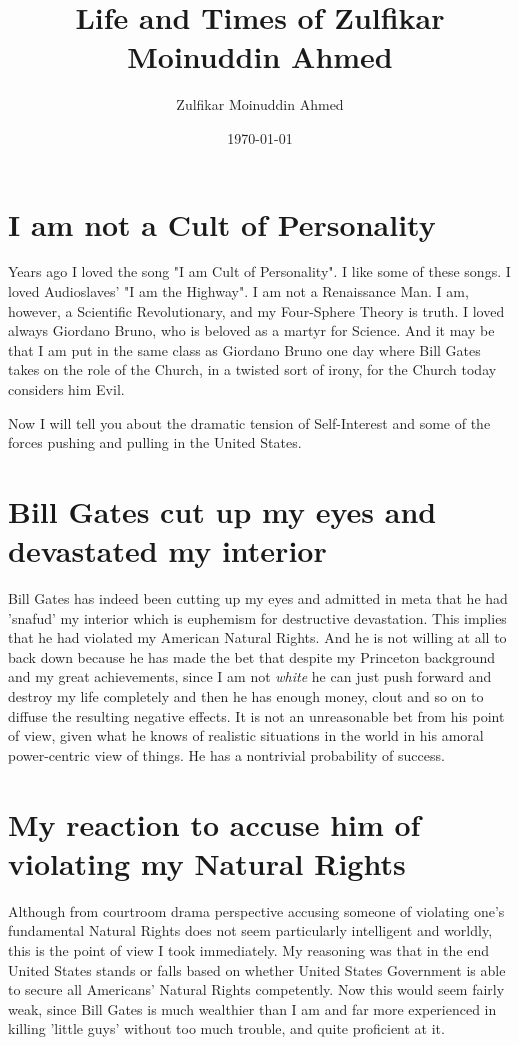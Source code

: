\documentclass{amsart}
\title{Life and Times of Zulfikar Moinuddin Ahmed}
\author{Zulfikar Moinuddin Ahmed}
\date{\today}
\begin{document}
\maketitle

\section{I am not a Cult of Personality}

Years ago I loved the song "I am Cult of Personality".  I like some of these songs.  I loved Audioslaves' "I am the Highway".  I am not a Renaissance Man.  I am, however, a Scientific Revolutionary, and my Four-Sphere Theory is truth.  I loved always Giordano Bruno, who is beloved as a martyr for Science.  And it may be that I am put in the same class as Giordano Bruno one day where Bill Gates takes on the role of the Church, in a twisted sort of irony, for the Church today considers him Evil. 

Now I will tell you about the dramatic tension of Self-Interest and some of the forces pushing and pulling in the United States.  

\section{Bill Gates cut up my eyes and devastated my interior}
Bill Gates has indeed been cutting up my eyes and admitted in meta that he had 'snafud' my interior which is euphemism for destructive devastation.  This implies that he had violated my American Natural Rights.  And he is not willing at all to back down because he has made the bet that despite my Princeton background and my great achievements, since I am not {\em white} he can just push forward and destroy my life completely and then he has enough money, clout and so on to diffuse the resulting negative effects. It is not an unreasonable bet from his point of view, given what he knows of realistic situations in the world in his amoral power-centric view of things.  He has a nontrivial probability of success.

\section{My reaction to accuse him of violating my Natural Rights}

Although from courtroom drama perspective accusing someone of violating one's fundamental Natural Rights does not seem particularly intelligent and worldly, this is the point of view I took immediately.  My reasoning was that in the end United States stands or falls based on whether United States Government is able to secure all Americans' Natural Rights competently.  Now this would seem fairly weak, since Bill Gates is much wealthier than I am and far more experienced in killing 'little guys' without too much trouble, and quite proficient at it.
\end{document}
